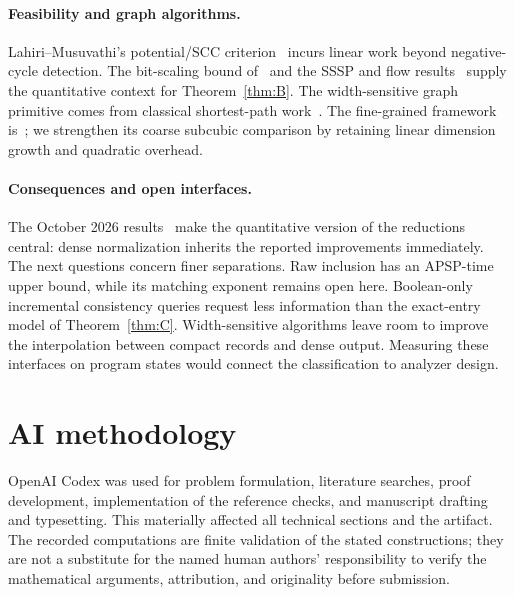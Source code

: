 \documentclass[manuscript,11pt,screen,nonacm]{acmart}
\theoremstyle{definition}
\begin{document}
\paragraph{Feasibility and graph algorithms.}
Lahiri--Musuvathi's potential/SCC criterion~\cite{lm2005} incurs linear work beyond negative-cycle detection. The bit-scaling bound of~\cite{subramani2023} and the SSSP and flow results~\cite{bnw2022,flow2022,bcf2023} supply the quantitative context for Theorem~\ref{thm:B}. The width-sensitive graph primitive comes from classical shortest-path work~\cite{planken2012}. The fine-grained framework is~\cite{vvw2018}; we strengthen its coarse subcubic comparison by retaining linear dimension growth and quadratic overhead.

\paragraph{Consequences and open interfaces.}
The October 2026 results~\cite{alman2026,karingula2026,saha2026,majdoddin2026} make the quantitative version of the reductions central: dense normalization inherits the reported improvements immediately. The next questions concern finer separations. Raw inclusion has an APSP-time upper bound, while its matching exponent remains open here. Boolean-only incremental consistency queries request less information than the exact-entry model of Theorem~\ref{thm:C}. Width-sensitive algorithms leave room to improve the interpolation between compact records and dense output. Measuring these interfaces on program states would connect the classification to analyzer design.

\section*{AI methodology}
OpenAI Codex was used for problem formulation, literature searches, proof development, implementation of the reference checks, and manuscript drafting and typesetting. This materially affected all technical sections and the artifact. The recorded computations are finite validation of the stated constructions; they are not a substitute for the named human authors' responsibility to verify the mathematical arguments, attribution, and originality before submission.

\clearpage


\end{document}

